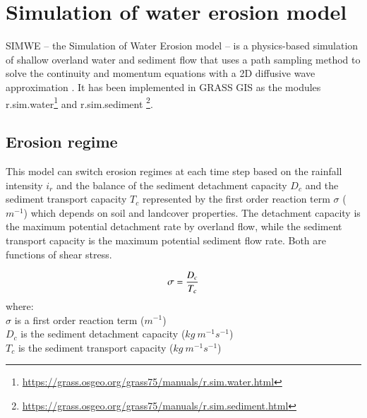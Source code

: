 \documentclass[final,3p,times,twocolumn]{elsarticle}
\begin{document}
\section{Simulation of water erosion model} \label{simwel}

SIMWE -- the Simulation of Water Erosion model -- 
is a physics-based simulation of shallow overland water and sediment flow
that uses a path sampling method to solve the continuity and momentum equations 
with a 2D diffusive wave approximation 
\cite{mitas1998,mitasova2001,mitasova2004}.
%
It has been implemented in GRASS GIS as the modules 
r.sim.water\footnote{\url{https://grass.osgeo.org/grass75/manuals/r.sim.water.html}} 
and r.sim.sediment \footnote{\url{https://grass.osgeo.org/grass75/manuals/r.sim.sediment.html}}.






\subsection{Erosion regime}
This model can switch erosion regimes at each time step
based on the rainfall intensity $i_r$
and the balance of the sediment detachment capacity $D_c$
and the sediment transport capacity $T_c$
represented by the first order reaction term $\sigma$ ($m^{-1}$)
which depends on soil and landcover properties.
The detachment capacity is the maximum potential detachment rate by overland flow, while
the sediment transport capacity is the maximum potential sediment flow rate.
Both are functions of shear stress.

\begin{equation}
\label{eq:regime}
\sigma = {D_c \over T_c}
\end{equation}
%
{\small
\noindent
where: \\
\noindent
\hspace*{0.5em} $\sigma$  is a first order reaction term ($m^{-1}$)\\
\hspace*{0.5em} $D_c$ is the sediment detachment capacity ($kg~m^{-1}s^{-1}$)\\
\hspace*{0.5em} $T_c$ is the sediment transport capacity ($kg~m^{-1}s^{-1}$)\\
}
\end{document}

